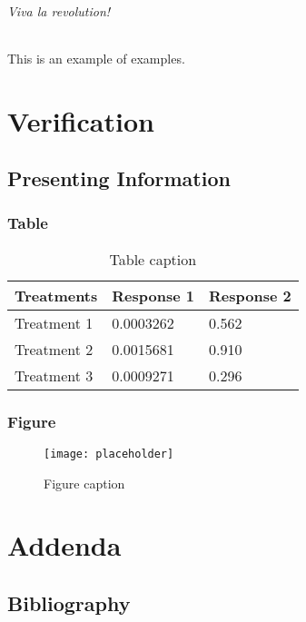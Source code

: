 \documentclass[11pt,fleqn,,a4paper,twoside,openright]{book}
\begin{document}
\paragraph{Viva la revolution!}

This is an example of examples.

\part{Verification}


\chapter{Presenting Information}

\section{Table}

\begin{table}[h]
\centering
\begin{tabular}{l l l}
\toprule
\textbf{Treatments} & \textbf{Response 1} & \textbf{Response 2}\\
\midrule
Treatment 1 & 0.0003262 & 0.562 \\
Treatment 2 & 0.0015681 & 0.910 \\
Treatment 3 & 0.0009271 & 0.296 \\
\bottomrule
\end{tabular}
\caption{Table caption}
\end{table}

\section{Figure}

\begin{figure}[h]
\centering\texttt{[image: placeholder]}
\caption{Figure caption}
\end{figure}

\part{Addenda}

\chapter*{Bibliography}
\end{document}
